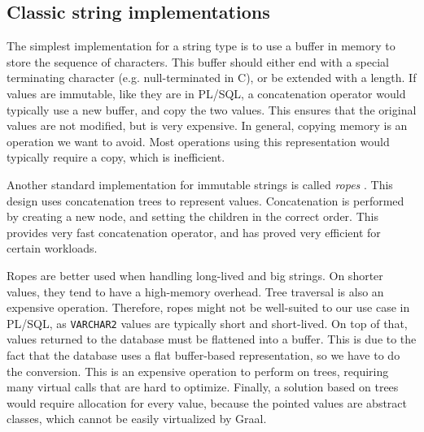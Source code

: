 \documentclass[twoside,11pt,a4paper]{article}
\newcommand{\pls}[1]{\small\texttt{#1}\normalsize}
\newcommand{\plstype}[1]{\pls{#1}}
\newcommand{\varchar}{\plstype{VARCHAR2}}
\begin{document}
\subsection{Classic string implementations}


The simplest implementation for a string type is to use a buffer in memory to store the sequence of characters. This buffer should either end with a special terminating character (e.g. null-terminated in C), or be extended with a length. If values are immutable, like they are in PL/SQL, a concatenation operator would typically use a new buffer, and copy the two values. This ensures that the original values are not modified, but is very expensive. In general, copying memory is an operation we want to avoid. Most operations using this representation would typically require a copy, which is inefficient.

Another standard implementation for immutable strings is called \textit{ropes} \cite{ropepaper}. This design uses concatenation trees to represent values. Concatenation is performed by creating a new node, and setting the children in the correct order. This provides very fast concatenation operator, and has proved very efficient for certain workloads.

Ropes are better used when handling long-lived and big strings. On shorter values, they tend to have a high-memory overhead. Tree traversal is also an expensive operation. Therefore, ropes might not be well-suited to our use case in PL/SQL, as \varchar{} values are typically short and short-lived. On top of that, values returned to the database must be flattened into a buffer. This is due to the fact that the database uses a flat buffer-based representation, so we have to do the conversion. This is an expensive operation to perform on trees, requiring many virtual calls that are hard to optimize. Finally, a solution based on trees would require allocation for every value, because the pointed values are abstract classes, which cannot be easily virtualized by Graal.
\end{document}
